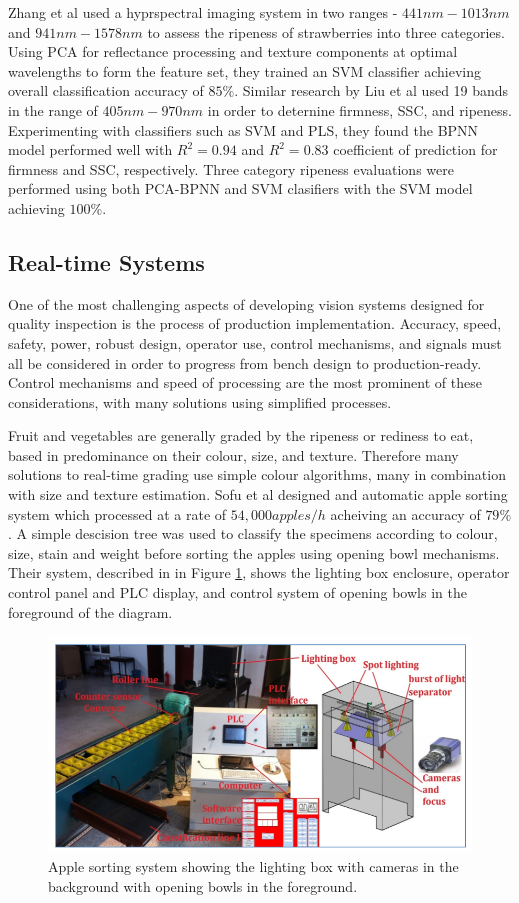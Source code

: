 \documentclass[fleqn,twoside]{article}
\begin{document}
Zhang et al \cite{zhang} used a hyprspectral imaging system in two ranges - $441nm-1013nm$ and $941nm-1578nm$ to assess the ripeness of strawberries into three categories. Using PCA for reflectance processing and texture components at optimal wavelengths to form the feature set, they trained an SVM classifier achieving overall classification accuracy of $85\%$. Similar research by Liu et al \cite{liu} used 19 bands in the range of $405nm-970nm$ in order to deternine firmness, SSC, and ripeness. Experimenting with classifiers such as SVM and PLS, they found the BPNN model performed well with $R^2=0.94$ and $R^2=0.83$ coefficient of prediction for firmness and SSC, respectively. Three category ripeness evaluations were performed using both PCA-BPNN and SVM clasifiers with the SVM model achieving $100\%$.

 




\subsection{Real-time Systems}

One of the most challenging aspects of developing vision systems designed for quality inspection is the process of production implementation. Accuracy, speed, safety, power, robust design, operator use, control mechanisms, and signals must all be considered in order to progress from bench design to production-ready. Control mechanisms and speed of processing are the most prominent of these considerations, with many solutions using simplified processes.

Fruit and vegetables are generally graded by the ripeness or rediness to eat, based in predominance on their colour, size, and texture. Therefore many solutions to real-time grading use simple colour algorithms, many in combination with size and texture estimation. Sofu et al \cite{sofu} designed and automatic apple sorting system which processed at a rate of $54,000 apples/h$ acheiving an accuracy of $79\%$. A simple descision tree was used to classify the specimens according to colour, size, stain and weight before sorting the apples using opening bowl mechanisms. Their system, described in in Figure \ref{fig:apple_system}, shows the lighting box enclosure, operator control panel and PLC display, and control system of opening bowls in the foreground of the diagram.

\begin{figure}[h]
	\centering
	\includegraphics[width=0.7\linewidth]{apple_system.png}
	\caption{Apple sorting system showing the lighting box with cameras in the background with opening bowls in the foreground.}
	\label{fig:apple_system}
\end{figure}%
\end{document}
